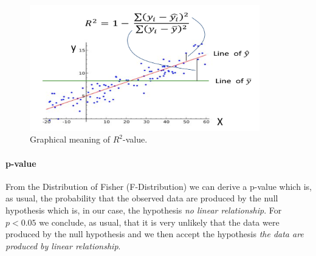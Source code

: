 \begin{figure}[H]%
 \centering
 \includegraphics[width=10cm]{./img/07/r_2.png}
 \caption{\label{pic:r_2} Graphical meaning of $R^2$-value.}
\end{figure}


\paragraph{p-value}

From the Distribution of Fisher (F-Distribution) we can derive a p-value which is, as usual, the probability that the observed data are produced by the null hypothesis which is, in our case, the hypothesis \textit{no linear relationship}. For $p < 0.05$ we conclude, as usual, that it is very unlikely that the data were produced by the null hypothesis and we then accept the hypothesis \textit{the data are produced by linear relationship}.














